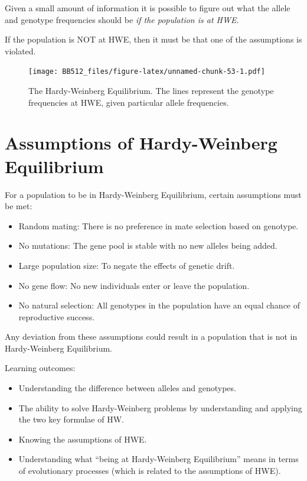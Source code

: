 \documentclass[
  a4paper]{book}
\providecommand{\tightlist}{%
  \setlength{\itemsep}{0pt}\setlength{\parskip}{0pt}}
\begin{document}
Given a small amount of information it is possible to figure out what the allele and genotype frequencies should be \emph{if the population is at HWE}.

If the population is NOT at HWE, then it must be that one of the assumptions is violated.

\begin{figure}
\centering
\texttt{[image: BB512\_files/figure-latex/unnamed-chunk-53-1.pdf]}
\caption{\label{fig:unnamed-chunk-53}The Hardy-Weinberg Equilibrium. The lines represent the genotype frequencies at HWE, given particular allele frequencies.}
\end{figure}

\hypertarget{assumptions-of-hardy-weinberg-equilibrium}{%
\section{Assumptions of Hardy-Weinberg Equilibrium}\label{assumptions-of-hardy-weinberg-equilibrium}}

For a population to be in Hardy-Weinberg Equilibrium, certain assumptions must be met:

\begin{itemize}
\tightlist
\item
  Random mating: There is no preference in mate selection based on genotype.
\item
  No mutations: The gene pool is stable with no new alleles being added.
\item
  Large population size: To negate the effects of genetic drift.
\item
  No gene flow: No new individuals enter or leave the population.
\item
  No natural selection: All genotypes in the population have an equal chance of reproductive success.
\end{itemize}

Any deviation from these assumptions could result in a population that is not in Hardy-Weinberg Equilibrium.

\begin{do-something}
Learning outcomes:

\begin{itemize}
\tightlist
\item
  Understanding the difference between alleles and genotypes.
\item
  The ability to solve Hardy-Weinberg problems by understanding and
  applying the two key formulae of HW.
\item
  Knowing the assumptions of HWE.
\item
  Understanding what ``being at Hardy-Weinberg Equilibrium'' means in
  terms of evolutionary processes (which is related to the assumptions
  of HWE).
\end{itemize}
\end{do-something}
\end{document}
